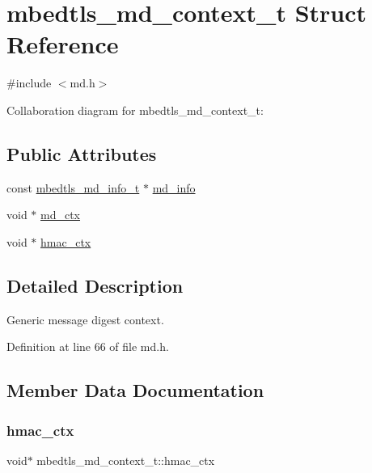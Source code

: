 \hypertarget{structmbedtls__md__context__t}{}\section{mbedtls\+\_\+md\+\_\+context\+\_\+t Struct Reference}
\label{structmbedtls__md__context__t}


{\ttfamily \#include $<$md.\+h$>$}



Collaboration diagram for mbedtls\+\_\+md\+\_\+context\+\_\+t\+:
\subsection*{Public Attributes}
\begin{DoxyCompactItemize}
\item 
const \mbox{\hyperlink{structmbedtls__md__info__t}{mbedtls\+\_\+md\+\_\+info\+\_\+t}} $\ast$ \mbox{\hyperlink{structmbedtls__md__context__t_a946ec8104697a039cf1990233cd41b28}{md\+\_\+info}}
\item 
void $\ast$ \mbox{\hyperlink{structmbedtls__md__context__t_af7dc1e93cbd6f9a3c52d1a5064732fe1}{md\+\_\+ctx}}
\item 
void $\ast$ \mbox{\hyperlink{structmbedtls__md__context__t_aabd68159641f26735e93b0b002d9ddce}{hmac\+\_\+ctx}}
\end{DoxyCompactItemize}


\subsection{Detailed Description}
Generic message digest context. 

Definition at line 66 of file md.\+h.



\subsection{Member Data Documentation}
\mbox{\label{structmbedtls__md__context__t_aabd68159641f26735e93b0b002d9ddce}} 
\subsubsection{\texorpdfstring{hmac\+\_\+ctx}{hmac\_ctx}}
{\footnotesize\ttfamily void$\ast$ mbedtls\+\_\+md\+\_\+context\+\_\+t\+::hmac\+\_\+ctx}

